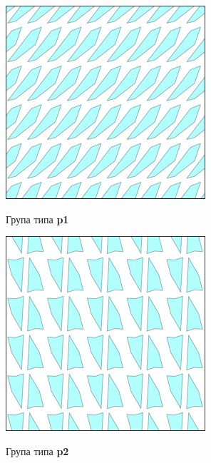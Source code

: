 \documentclass[12pt]{report}
\begin{document}
\begin{figure}
\begin{subfigure}[b]{0.3\textwidth}
    \includegraphics[width=.8\textwidth]{plavo_p1.png}
    \label{fig:f4}
    \caption{Група типа \textbf{p1}}
  \end{subfigure}
  \begin{subfigure}[b]{0.3\textwidth}
    \includegraphics[width=.8\textwidth]{plavo_p2.png}
    \label{fig:f5}
    \caption{Група типа \textbf{p2}}
    \end{subfigure}
  \begin{subfigure}[b]{0.3\textwidth}

\end{subfigure}
\end{figure}
\end{document}
